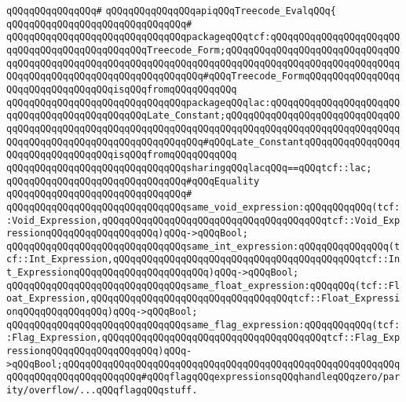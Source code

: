 \verb|qQQqqQQqqQQqqQQq#|\newline
\verb|qQQqqQQqqQQqqQQqapiqQQqTreecode_EvalqQQq{|\newline
\verb|qQQqqQQqqQQqqQQqqQQqqQQqqQQqqQQq#|\newline
\verb|qQQqqQQqqQQqqQQqqQQqqQQqqQQqqQQqpackageqQQqtcf:qQQqqQQqqQQqqQQqqQQqqQQqqQQqqQQqqQQqqQQqqQQqqQQqTreecode_Form;qQQqqQQqqQQqqQQqqQQqqQQqqQQqqQQqqQQqqQQqqQQqqQQqqQQqqQQqqQQqqQQqqQQqqQQqqQQqqQQqqQQqqQQqqQQqqQQqqQQqqQQqqQQqqQQqqQQqqQQqqQQqqQQqqQQqqQQq#qQQqTreecode_FormqQQqqQQqqQQqqQQqqQQqqQQqqQQqqQQqqQQqisqQQqfromqQQqqQQqqQQq|\newline
\verb|qQQqqQQqqQQqqQQqqQQqqQQqqQQqqQQqpackageqQQqlac:qQQqqQQqqQQqqQQqqQQqqQQqqQQqqQQqqQQqqQQqqQQqqQQqLate_Constant;qQQqqQQqqQQqqQQqqQQqqQQqqQQqqQQqqQQqqQQqqQQqqQQqqQQqqQQqqQQqqQQqqQQqqQQqqQQqqQQqqQQqqQQqqQQqqQQqqQQqqQQqqQQqqQQqqQQqqQQqqQQqqQQqqQQqqQQq#qQQqLate_ConstantqQQqqQQqqQQqqQQqqQQqqQQqqQQqqQQqqQQqisqQQqfromqQQqqQQqqQQq|\newline
\verb|qQQqqQQqqQQqqQQqqQQqqQQqqQQqqQQqsharingqQQqlacqQQq==qQQqtcf::lac;|\newline
\newline
\verb|qQQqqQQqqQQqqQQqqQQqqQQqqQQqqQQq#qQQqEquality|\newline
\verb|qQQqqQQqqQQqqQQqqQQqqQQqqQQqqQQq#|\newline
\verb|qQQqqQQqqQQqqQQqqQQqqQQqqQQqqQQqsame_void_expression:qQQqqQQqqQQq(tcf::Void_Expression,qQQqqQQqqQQqqQQqqQQqqQQqqQQqqQQqqQQqqQQqtcf::Void_ExpressionqQQqqQQqqQQqqQQqqQQq)qQQq->qQQqBool;|\newline
\verb|qQQqqQQqqQQqqQQqqQQqqQQqqQQqqQQqsame_int_expression:qQQqqQQqqQQqqQQq(tcf::Int_Expression,qQQqqQQqqQQqqQQqqQQqqQQqqQQqqQQqqQQqqQQqqQQqtcf::Int_ExpressionqQQqqQQqqQQqqQQqqQQqqQQq)qQQq->qQQqBool;|\newline
\verb|qQQqqQQqqQQqqQQqqQQqqQQqqQQqqQQqsame_float_expression:qQQqqQQq(tcf::Float_Expression,qQQqqQQqqQQqqQQqqQQqqQQqqQQqqQQqqQQqtcf::Float_ExpressionqQQqqQQqqQQqqQQq)qQQq->qQQqBool;|\newline
\verb|qQQqqQQqqQQqqQQqqQQqqQQqqQQqqQQqsame_flag_expression:qQQqqQQqqQQq(tcf::Flag_Expression,qQQqqQQqqQQqqQQqqQQqqQQqqQQqqQQqqQQqqQQqtcf::Flag_ExpressionqQQqqQQqqQQqqQQqqQQq)qQQq->qQQqBool;qQQqqQQqqQQqqQQqqQQqqQQqqQQqqQQqqQQqqQQqqQQqqQQqqQQqqQQqqQQqqQQqqQQqqQQqqQQqqQQqqQQq#qQQqflagqQQqexpressionsqQQqhandleqQQqzero/parity/overflow/...qQQqflagqQQqstuff.|\newline
